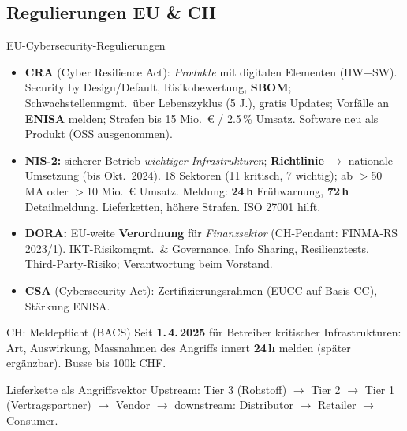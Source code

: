 \documentclass[a4paper, fontsize=7pt]{scrartcl}
\begin{document}
\subsection{Regulierungen EU \& CH}

\begin{mainbox}{EU-Cybersecurity-Regulierungen}
\begin{itemize}
    \item \textbf{CRA} (Cyber Resilience Act): \emph{Produkte} mit digitalen
          Elementen (HW+SW). Security by Design/Default, Risikobewertung,
          \textbf{SBOM}; Schwachstellenmgmt.\ über Lebenszyklus (5 J.), gratis
          Updates; Vorfälle an \textbf{ENISA} melden; Strafen bis 15 Mio.\ € /
          2.5\,\% Umsatz. Software neu als Produkt (OSS ausgenommen).
    \item \textbf{NIS-2:} sicherer Betrieb \emph{wichtiger Infrastrukturen};
          \textbf{Richtlinie} $\to$ nationale Umsetzung (bis Okt.\ 2024). 18 Sektoren
          (11 kritisch, 7 wichtig); ab $>$50 MA oder $>$10 Mio.\ € Umsatz.
          Meldung: \textbf{24\,h} Frühwarnung, \textbf{72\,h} Detailmeldung.
          Lieferketten, höhere Strafen. ISO 27001 hilft.
    \item \textbf{DORA:} EU-weite \textbf{Verordnung} für \emph{Finanzsektor}
          (CH-Pendant: FINMA-RS 2023/1). IKT-Risikomgmt.\ \& Governance, Info
          Sharing, Resilienztests, Third-Party-Risiko; Verantwortung beim Vorstand.
    \item \textbf{CSA} (Cybersecurity Act): Zertifizierungsrahmen (EUCC auf
          Basis CC), Stärkung ENISA.
\end{itemize}
\end{mainbox}

\begin{mainbox}{CH: Meldepflicht (BACS)}
Seit \textbf{1.\,4.\,2025} für Betreiber kritischer Infrastrukturen: Art,
Auswirkung, Massnahmen des Angriffs innert \textbf{24\,h} melden (später
ergänzbar). Busse bis 100k CHF.
\end{mainbox}

\begin{subbox}{Lieferkette als Angriffsvektor}
Upstream: Tier 3 (Rohstoff) $\to$ Tier 2 $\to$ Tier 1 (Vertragspartner)
$\to$ Vendor $\to$ downstream: Distributor $\to$ Retailer $\to$ Consumer.
\end{subbox}
\end{document}
